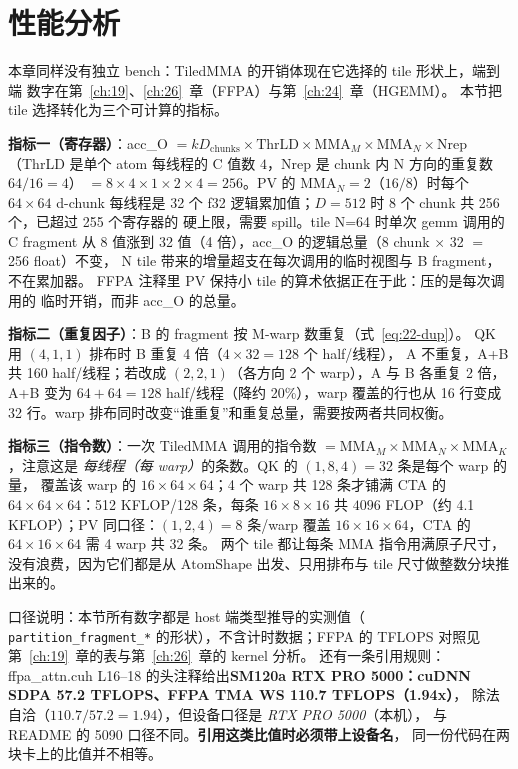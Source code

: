 \section{性能分析}

本章同样没有独立 bench：TiledMMA 的开销体现在它选择的 tile 形状上，端到端
数字在第~\ref{ch:19}、\ref{ch:26}~章（FFPA）与第~\ref{ch:24}~章（HGEMM）。
本节把 tile 选择转化为三个可计算的指标。

\textbf{指标一（寄存器）}：acc\_O $=kD_{\mathrm{chunks}}\times\mathrm{ThrLD}
\times\mathrm{MMA}_M\times\mathrm{MMA}_N\times\mathrm{Nrep}$（ThrLD 是单个
atom 每线程的 C 值数 $4$，Nrep 是 chunk 内 N 方向的重复数 $64/16=4$）
$=8\times4\times1\times2\times4=256$。PV 的
$\mathrm{MMA}_N = 2$（$16/8$）时每个 $64\times64$ d-chunk 每线程是 32 个
f32 逻辑累加值；$D=512$ 时 $8$ 个 chunk 共 256 个，已超过 255 个寄存器的
硬上限，需要 spill。tile N=64 时单次 gemm 调用的 C fragment 从 8 值涨到
32 值（4 倍），acc\_O 的逻辑总量（8 chunk $\times$ 32 $=$ 256 float）不变，
N tile 带来的增量超支在每次调用的临时视图与 B fragment，不在累加器。
FFPA 注释里 PV 保持小 tile 的算术依据正在于此：压的是每次调用的
临时开销，而非 acc\_O 的总量。

\textbf{指标二（重复因子）}：B 的 fragment 按 M-warp 数重复（式~\eqref{eq:22-dup}）。
QK 用 $(4,1,1)$ 排布时 B 重复 4 倍（$4\times32=128$ 个 half/线程），
A 不重复，A+B 共 160 half/线程；若改成 $(2,2,1)$（各方向 2 个 warp），A 与 B
各重复 2 倍，A+B 变为 $64+64=128$ half/线程（降约 20\%），warp 覆盖的行也从
16 行变成 32 行。warp 排布同时改变“谁重复”和重复总量，需要按两者共同权衡。

\textbf{指标三（指令数）}：一次 TiledMMA 调用的指令数
$=\mathrm{MMA}_M\times\mathrm{MMA}_N\times\mathrm{MMA}_K$，注意这是
\emph{每线程（每 warp）}的条数。QK 的 $(1,8,4)=32$ 条是每个 warp 的量，
覆盖该 warp 的 $16\times64\times64$；4 个 warp 共 128 条才铺满 CTA 的
$64\times64\times64$：512 KFLOP/128 条，每条 $16\times8\times16$ 共
$4096$ FLOP（约 4.1 KFLOP）；PV 同口径：$(1,2,4)=8$ 条/warp 覆盖
$16\times16\times64$，CTA 的 $64\times16\times64$ 需 4 warp 共 32 条。
两个 tile 都让每条 MMA 指令用满原子尺寸，没有浪费，因为它们都是从
$\mathrm{AtomShape}$ 出发、只用排布与 tile 尺寸做整数分块推出来的。

口径说明：本节所有数字都是 host 端类型推导的实测值（
\texttt{partition\_\allowbreak{}fragment\_\allowbreak{}*} 的形状），不含计时数据；FFPA 的
TFLOPS 对照见第~\ref{ch:19}~章的表与第~\ref{ch:26}~章的 kernel 分析。
还有一条引用规则：ffpa\_attn.cuh L16--18 的头注释给出\textbf{SM120a
RTX PRO 5000：cuDNN SDPA 57.2 TFLOPS、FFPA TMA WS 110.7 TFLOPS（1.94x）}，
除法自洽（$110.7/57.2=1.94$），但设备口径是 \emph{RTX PRO 5000}（本机），
与 README 的 5090 口径不同。\textbf{引用这类比值时必须带上设备名}，
同一份代码在两块卡上的比值并不相等。


